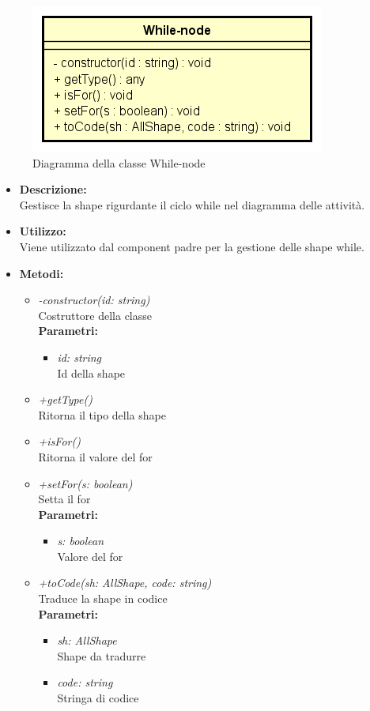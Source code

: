 \begin{figure}[h!]
	\centering
	\includegraphics[scale=0.8]{res/sections/SpecificaFrontEnd/Services/Disegnetti/while-node.png}
	\caption{Diagramma della classe While-node}
\end{figure}

\begin{itemize}
	\item \textbf{Descrizione:}\\
	Gestisce la shape rigurdante il ciclo while nel diagramma delle attività.
	\item \textbf{Utilizzo:}\\
	Viene utilizzato dal component padre per la gestione delle shape while.
	\item \textbf{Metodi:}
		\begin{itemize}
			\item \emph{-constructor(id: string)}\\
    		Costruttore della classe\\
    		\textbf{Parametri:}
    		\begin{itemize}
    			\item \emph{id: string}\\
    			Id della shape
    		\end{itemize}
    		\item \emph{+getType()}\\
    		Ritorna il tipo della shape
    		\item \emph{+isFor()}\\
    		Ritorna il valore del for
    		\item \emph{+setFor(s: boolean)}\\
    		Setta il for\\
    		\textbf{Parametri:}
    		\begin{itemize}
    			\item \emph{s: boolean}\\
    			Valore del for
    		\end{itemize}
    		\item \emph{+toCode(sh: AllShape, code: string)}\\
    		Traduce la shape in codice\\
    		\textbf{Parametri:}
    		\begin{itemize}
    			\item \emph{sh: AllShape}\\
    			Shape da tradurre
    			\item \emph{code: string}\\
    			Stringa di codice
    		\end{itemize}
    	\end{itemize}
\end{itemize}